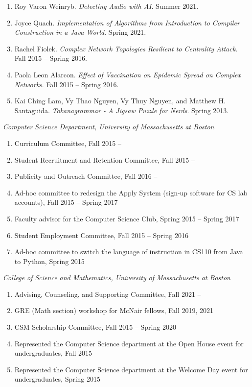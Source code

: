 \documentclass[12pt]{article}
\renewcommand{\section}[2]%
        {\pagebreak[2]\vspace{1.3\baselineskip}%
         \phantomsection\addcontentsline{toc}{section}{#1}%
         \hspace{0in}%
         \marginpar{
         \raggedright \scshape #1}#2}
\newenvironment{outerlist}[1][\enskip\textbullet]%
        {\begin{enumerate}[#1]}{\end{enumerate}%
         \vspace{-.6\baselineskip}}
\newcommand{\blankline}{\quad\pagebreak[2]}
\begin{document}
\begin{outerlist}
\item Roy Varon Weinryb. \textit{Detecting Audio with AI}. Summer 2021.

\item Joyce Quach. \textit{Implementation of Algorithms from Introduction to Compiler Construction in a Java World}. Spring 2021.

\item Rachel Fiolek. \textit{Complex Network Topologies Resilient to Centrality Attack}. Fall 2015 -- Spring 2016.

\item Paola Leon Alarcon. \textit{Effect of Vaccination on Epidemic Spread on Complex Networks}. Fall 2015 -- Spring 2016.

\item Kai Ching Lam, Vy Thao Nguyen, Vy Thuy Nguyen, and Matthew H. Santaguida. \textit{Tokanagrammar - A Jigsaw Puzzle for Nerds}. Spring 2013.
\end{outerlist}

\blankline

\section{Service}
\textit{Computer Science Department, University of Massachusetts at Boston}

\begin{outerlist}
\item Curriculum Committee, Fall 2015 --
\item Student Recruitment and Retention Committee, Fall 2015 --
\item Publicity and Outreach Committee, Fall 2016 --
\item Ad-hoc committee to redesign the Apply System (sign-up software for CS lab accounts), Fall 2015 -- Spring 2017
\item Faculty advisor for the Computer Science Club, Spring 2015 -- Spring 2017
\item Student Employment Committee, Fall 2015 -- Spring 2016
\item Ad-hoc committee to switch the language of instruction in CS110 from Java to Python, Spring 2015
\end{outerlist}

\blankline

\textit{College of Science and Mathematics, University of Massachusetts at Boston}

\begin{outerlist}
\item Advising, Counseling, and Supporting Committee, Fall 2021 --
\item GRE (Math section) workshop for McNair fellows, Fall 2019, 2021 
\item CSM Scholarship Committee, Fall 2015 -- Spring 2020
\item Represented the Computer Science department at the Open House event for undergraduates, Fall 2015
\item Represented the Computer Science department at the Welcome Day event for undergraduates, Spring 2015
\end{outerlist}
\end{document}
